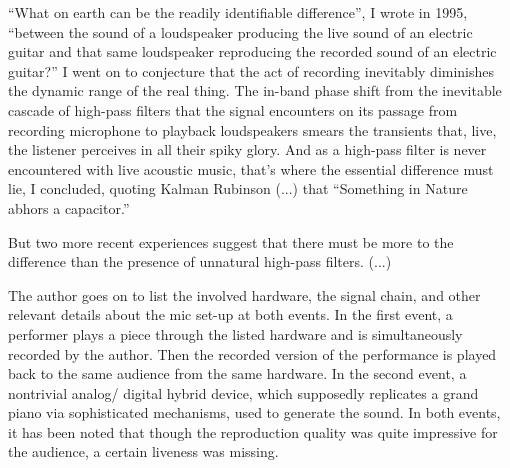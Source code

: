\begin{displayquote}
\enquote{What on earth can be the readily identifiable difference}, I wrote in 1995, \enquote{between the sound of a loudspeaker 
producing the live sound of an electric guitar and that same loudspeaker reproducing the recorded sound of an electric guitar?} 
I went on to conjecture that the act of recording inevitably diminishes the dynamic range of the real thing. The in-band phase 
shift from the inevitable cascade of high-pass filters that the signal encounters on its passage from recording microphone to 
playback loudspeakers smears the transients that, live, the listener perceives in all their spiky glory. And as a high-pass filter 
is never encountered with live acoustic music, that's where the essential difference must lie, I concluded, quoting Kalman Rubinson 
(...) that \enquote{Something in Nature abhors a capacitor.}

But two more recent experiences suggest that there must be more to the difference than the presence of unnatural high-pass filters. 
(...)
\end{displayquote}

The author goes on to list the involved hardware, the signal chain, and other relevant details about the mic set-up at both events.
In the first event, a performer plays a piece through the listed hardware and is simultaneously recorded by the author. Then the recorded 
version of the performance is played back to the same audience from the same hardware. In the second event, a nontrivial analog/
digital hybrid device, which supposedly replicates a grand piano via sophisticated mechanisms, used to generate the sound. In both 
events, it has been noted that though the reproduction quality was quite impressive for the audience, a certain liveness was missing.

